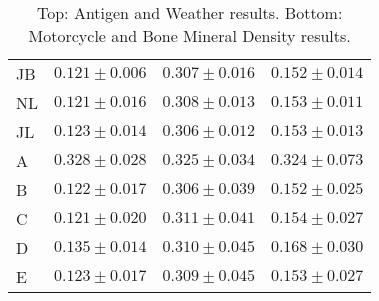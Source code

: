 \documentclass[twoside]{article} \usepackage{aistats2017}
\theoremstyle{definition}
\theoremstyle{theorem}
\begin{document}
\begin{table*}
\begin{center}
{\begin{tabular}{l|ccc}
									JB & $0.121 \pm 0.006$ & $0.307 \pm 0.016$ & $0.152 \pm 0.014$ \\
									NL & $0.121 \pm 0.016$ & $0.308 \pm 0.013$ & $0.153 \pm 0.011$ \\
									JL & $0.123 \pm 0.014$ & $\mathbf{0.306 \pm 0.012}$ & $0.153 \pm 0.013$ \\
									A & $0.328 \pm 0.028$ & $0.325 \pm 0.034$ & $0.324 \pm 0.073$ \\
									B & $0.122 \pm 0.017$ & $\mathbf{0.306 \pm 0.039}$ & $0.152 \pm 0.025$ \\
									C & $0.121 \pm 0.020$ & $0.311 \pm 0.041$ & $0.154 \pm 0.027$ \\
									D & $0.135 \pm 0.014$ & $0.310 \pm 0.045$ & $0.168 \pm 0.030$ \\
									E & $0.123 \pm 0.017$ & $0.309 \pm 0.045$ & $0.153 \pm 0.027$
								\end{tabular}}
							\end{center}
							
							\caption{Top: Antigen and Weather results. Bottom: Motorcycle and Bone Mineral Density results.}
							
							\label{table:results}
						\end{table*}
						
						
\end{document}
